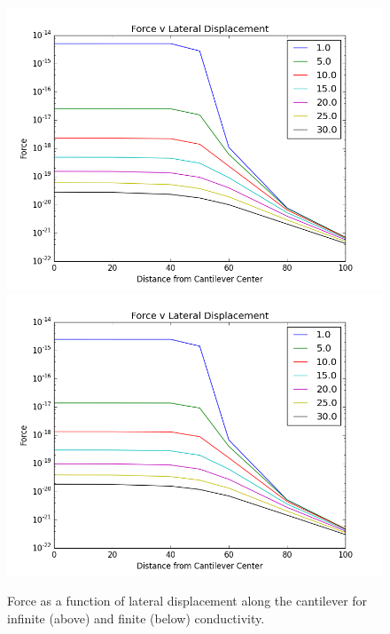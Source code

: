 \documentclass[11pt,traditabstract]{article}
\begin{document}
\begin{figure}[h]
\centering
\includegraphics[width=5in]{lateral_force}
\includegraphics[width=5in]{lateral_force_finite}
\caption{Force as a function of lateral displacement along the cantilever for infinite (above) and finite (below) conductivity.}\label{fig:lat}
\end{figure}
\end{document}

